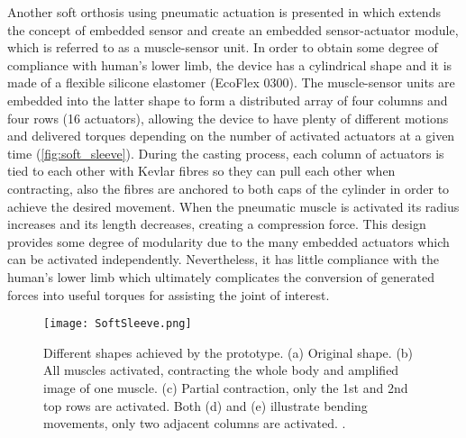 Another soft orthosis using pneumatic actuation is presented in \cite{Park2012} which extends the concept of embedded sensor and create an embedded sensor-actuator module, which is referred to as a muscle-sensor unit. In order to obtain some degree of compliance with human's lower limb, the device has a cylindrical shape and it is made of a flexible silicone elastomer (EcoFlex 0300). The muscle-sensor units are embedded into the latter shape to form a distributed array of four columns and four rows (16 actuators), allowing the device to have plenty of different motions and delivered torques depending on the number of activated actuators at a given time (\autoref{fig:soft_sleeve}). During the casting process, each column of actuators is tied to each other with Kevlar fibres so they can pull each other when contracting, also the fibres are anchored to both caps of the cylinder in order to achieve the desired movement. When the pneumatic muscle is activated its radius increases and its length decreases, creating a compression force. This design provides some degree of modularity due to the many embedded actuators which can be activated independently. Nevertheless, it has little compliance with the human's lower limb which ultimately complicates the conversion of generated forces into useful torques for assisting the joint of interest.
\begin{figure}[hbtp!]
    \centering
    \texttt{[image: SoftSleeve.png]}
    \caption{Different shapes achieved by the prototype. (a) Original shape. (b) All muscles activated, contracting the whole body and amplified image of one muscle. (c) Partial contraction, only the 1st and 2nd top rows are activated. Both (d) and (e) illustrate bending movements, only two adjacent columns are activated. \cite{Park2012}. }
    \label{fig:soft_sleeve}
\end{figure}

